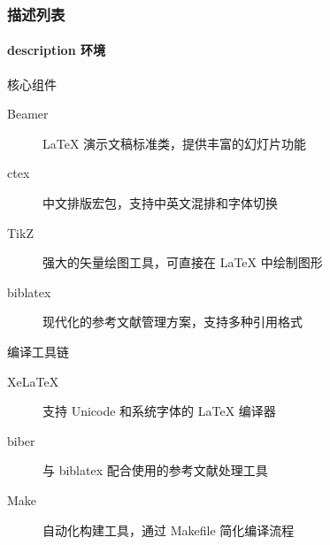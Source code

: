 \begin{frame}
\frametitle{描述列表}
\framesubtitle{description 环境}

\begin{block}{核心组件}
\begin{description}
\item[Beamer] LaTeX 演示文稿标准类，提供丰富的幻灯片功能
\item[ctex] 中文排版宏包，支持中英文混排和字体切换
\item[TikZ] 强大的矢量绘图工具，可直接在 LaTeX 中绘制图形
\item[biblatex] 现代化的参考文献管理方案，支持多种引用格式
\end{description}
\end{block}

\begin{exampleblock}{编译工具链}
\begin{description}
\item[XeLaTeX] 支持 Unicode 和系统字体的 LaTeX 编译器
\item[biber] 与 biblatex 配合使用的参考文献处理工具
\item[Make] 自动化构建工具，通过 Makefile 简化编译流程
\end{description}
\end{exampleblock}
\end{frame}
